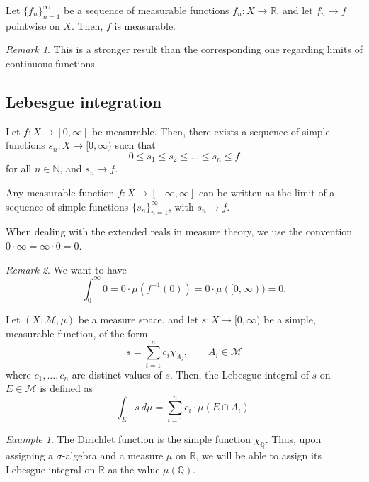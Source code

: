 \documentclass[11pt]{article}
\newcommand{\R}{\mathbb{R}}
\newcommand{\Q}{\mathbb{Q}}
\newcommand{\N}{\mathbb{N}}
\newcommand{\M}{\mathcal{M}}
\theoremstyle{definition}
\theoremstyle{remark}
\newtheorem*{remark}{Remark}
\newtheorem*{example}{Example}
\numberwithin{equation}{section}
\begin{document}
    \begin{theorem}
        Let $\{f_n\}_{n = 1}^\infty$ be a sequence of measurable functions $f_n\colon
        X \to \R$, and let $f_n \to f$ pointwise on $X$. Then, $f$ is measurable.
        \begin{remark}
            This is a stronger result than the corresponding one regarding limits of
            continuous functions.
        \end{remark}
    \end{theorem}

    

    \subsection{Lebesgue integration}

    \begin{theorem}
        Let $f\colon X \to [0, \infty]$ be measurable. Then, there exists a sequence
        of simple functions $s_n\colon X \to [0, \infty)$ such that \[
            0 \leq s_1 \leq s_2 \leq \dots \leq s_n \leq f
        \] for all $n \in \N$, and $s_n \to f$.
    \end{theorem}
    \begin{corollary}
        Any measurable function $f\colon X \to [-\infty, \infty]$ can be written as
        the limit of a sequence of simple functions $\{s_n\}_{n = 1}^\infty$, with
        $s_n \to f$.
    \end{corollary}

    \begin{definition}
        When dealing with the extended reals in measure theory, we use the convention
        $0\cdot \infty = \infty \cdot 0 = 0$.
        \begin{remark}
            We want to have \[
                \int_0^\infty 0 = 0\cdot \mu(f^{-1}(0)) = 0\cdot \mu([0, \infty)) =
                0.
            \] 
        \end{remark}
    \end{definition}

    
    \begin{definition}
        Let $(X, \M, \mu)$ be a measure space, and let $s\colon X \to [0, \infty)$ be
        a simple, measurable function, of the form \[
            s = \sum_{i = 1}^n c_i\chi_{A_i}, \qquad A_i \in \M
        \] where $c_1, \dots, c_n$ are distinct values of $s$. Then, the Lebesgue
        integral of $s$ on $E \in \M$ is defined as \[
            \int_E s\:d\mu = \sum_{i = 1}^n c_i\cdot \mu(E \cap A_i).
        \] 
    \end{definition}
    \begin{example}
        The Dirichlet function is the simple function $\chi_\Q$. Thus, upon assigning
        a $\sigma$-algebra and a measure $\mu$ on $\R$, we will be able to assign its
        Lebesgue integral on $\R$ as the value $\mu(\Q)$.
    \end{example}
    
\end{document}
